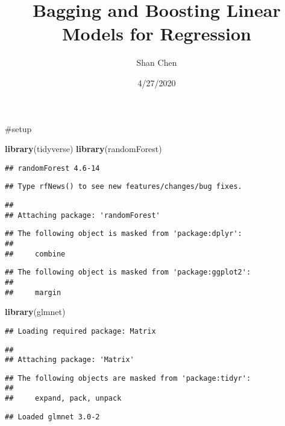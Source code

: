 \documentclass[]{article}
\title{Bagging and Boosting Linear Models for Regression}
\author{Shan Chen}
\date{4/27/2020}
\newenvironment{Shaded}{\begin{snugshade}}{\end{snugshade}}
\newcommand{\KeywordTok}[1]{\textcolor[rgb]{0.13,0.29,0.53}{\textbf{#1}}}
\newcommand{\NormalTok}[1]{#1}
\begin{document}
\maketitle

\#setup

\begin{Shaded}
\begin{Highlighting}[]
\KeywordTok{library}\NormalTok{(tidyverse)}
\KeywordTok{library}\NormalTok{(randomForest)}
\end{Highlighting}
\end{Shaded}

\begin{verbatim}
## randomForest 4.6-14
\end{verbatim}

\begin{verbatim}
## Type rfNews() to see new features/changes/bug fixes.
\end{verbatim}

\begin{verbatim}
## 
## Attaching package: 'randomForest'
\end{verbatim}

\begin{verbatim}
## The following object is masked from 'package:dplyr':
## 
##     combine
\end{verbatim}

\begin{verbatim}
## The following object is masked from 'package:ggplot2':
## 
##     margin
\end{verbatim}

\begin{Shaded}
\begin{Highlighting}[]
\KeywordTok{library}\NormalTok{(glmnet)}
\end{Highlighting}
\end{Shaded}

\begin{verbatim}
## Loading required package: Matrix
\end{verbatim}

\begin{verbatim}
## 
## Attaching package: 'Matrix'
\end{verbatim}

\begin{verbatim}
## The following objects are masked from 'package:tidyr':
## 
##     expand, pack, unpack
\end{verbatim}

\begin{verbatim}
## Loaded glmnet 3.0-2
\end{verbatim}
\end{document}
